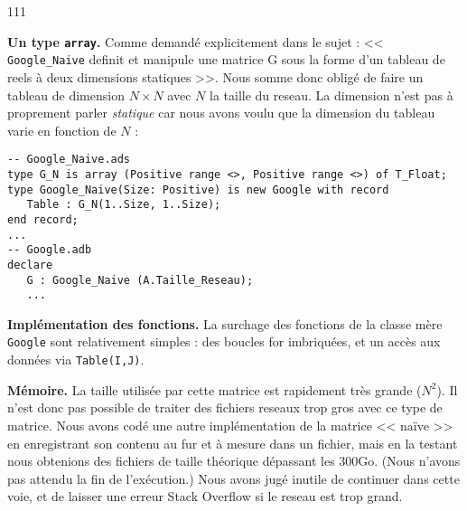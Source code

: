 \begin{dinglist}{111}
   \item \textbf{Un type \lstinline{array}.}
     Comme demandé explicitement dans le sujet : << \lstinline{Google_Naive} definit et manipule une matrice G sous la forme d’un tableau de reels à deux dimensions statiques >>.
     Nous somme donc obligé de faire un tableau de dimension $N \times N$ avec $N$ la taille du reseau. La dimension n'est pas à proprement parler \textit{statique}
   car nous avons voulu que la dimension du tableau varie en fonction de $N$ : 
   \begin{lstlisting}[caption=Type de \lstinline{Google_Naive}]
-- Google_Naive.ads
type G_N is array (Positive range <>, Positive range <>) of T_Float;
type Google_Naive(Size: Positive) is new Google with record
   Table : G_N(1..Size, 1..Size);
end record;
...
-- Google.adb
declare
   G : Google_Naive (A.Taille_Reseau);
   ...
      \end{lstlisting}
   \item \textbf{Implémentation des fonctions.} La surchage des fonctions de la classe mère \lstinline{Google} sont relativement simples : des boucles for imbriquées, et un accès aux données via \lstinline{Table(I,J)}.
   \item \textbf{Mémoire.} La taille utilisée par cette matrice est rapidement très grande ($N^{2}$). Il n'est donc pas possible de traiter des fichiers reseaux trop gros avec ce type de matrice.
   Nous avons codé une autre implémentation de la matrice << naïve >> en enregistrant son contenu au fur et à mesure dans un fichier, mais en la testant nous obtenions des fichiers de taille théorique dépassant les 300Go.
   (Nous n'avons pas attendu la fin de l'exécution.) Nous avons jugé inutile de continuer dans cette voie, et de laisser une erreur Stack Overflow si le reseau est trop grand.
   
\end{dinglist}